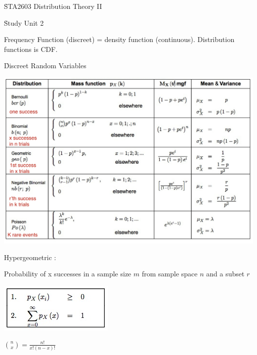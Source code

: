 \documentclass{examnotes}
\begin{document}
\obeylines

\h{STA2603 Distribution Theory II}

{} \hfill  {}

\h{Study Unit 2}

Frequency Function (discreet) = density function (continuous).
Distribution functions is CDF.

\h{Discreet Random Variables}

\includegraphics[scale=0.5]{./img/disscreet.jpg}

\disobeylines
Hypergeometric :
\obeylines

Probability of x successes in a sample size $m$ from sample space $n$ and a subset $r$  

\includegraphics[scale=0.8]{./img/2dis.jpg}

$\binom{n}{x} = \displaystyle\frac{n!}{x!(n-x)!}$


\vspace{6pt}
\end{document}
